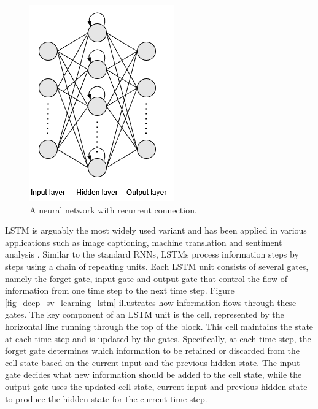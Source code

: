 \documentclass[preprint,12pt]{elsarticle}
\begin{document}
\begin{figure}[h!]
    \centering
    \includegraphics[scale=0.6]{fig_deep_sv_learning_rnn.png}
    \caption{A neural network with recurrent connection.}
    \label{fig_deep_sv_learning_rnn}
\end{figure}

LSTM is arguably the most widely used variant and has been applied in various applications such as image captioning, machine translation and sentiment analysis \citep{van_houdt_review_2020}. Similar to the standard RNNs, LSTMs process information steps by steps using a chain of repeating units. Each LSTM unit consists of several gates, namely the forget gate, input gate and output gate that control the flow of information from one time step to the next time step. Figure \ref{fig_deep_sv_learning_lstm} illustrates how information flows through these gates. The key component of an LSTM unit is the cell, represented by the horizontal line running through the top of the block. This cell maintains the state at each time step and is updated by the gates. Specifically, at each time step, the forget gate determines which information to be retained or discarded from the cell state based on the current input and the previous hidden state. The input gate decides what new information should be added to the cell state, while the output gate uses the updated cell state, current input and previous hidden state to produce the hidden state for the current time step.
\end{document}
